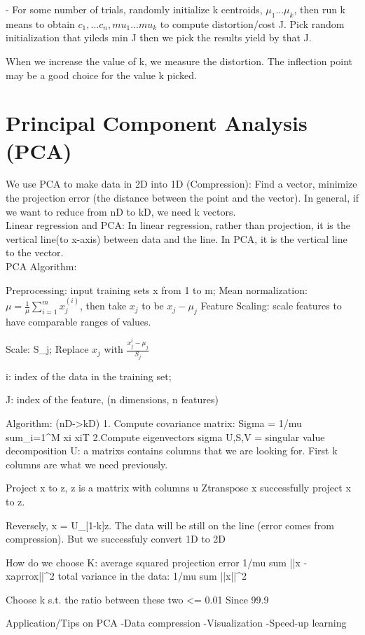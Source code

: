 \documentclass{article}
\begin{document}
- For some number of trials, randomly initialize k centroids, $\mu_1 ... \mu_k$, then run k means to obtain $c_1,...c_n, mu_1...mu_k$
to compute distortion/cost J. Pick random initialization that yileds min J
then we pick the results yield by that J.

When we increase the value of k, we measure the distortion. The inflection point may be a good choice for the value k picked.

\section*{Principal Component Analysis (PCA)}
We use PCA to make data in 2D into 1D (Compression): Find a vector, minimize the projection error (the distance between the point and the vector). In general, if we want to reduce from nD to kD, we need k vectors.\\


Linear regression and PCA: In linear regression, rather than projection, it is the vertical line(to x-axis) between data and the line. In PCA, it is the vertical line to the vector. \\

PCA Algorithm:

Preprocessing: input training sets x from 1 to m;
Mean normalization: $\mu = \frac{1}{\mu}\sum_{i=1}^m x_j^{(i)}$, then take $x_j$ to be $x_j - \mu_j$
Feature Scaling: scale features to have comparable ranges of values. 

Scale: S_j; Replace $x_j$ with $\frac{x_j^i - \mu_j}{S_j}$

i: index of the data in the training set; 

J: index of the feature, (n dimensions, n features)

Algorithm: (nD->kD)
1. Compute covariance matrix:
Sigma = 1/mu sum_i=1^M xi xiT
2.Compute eigenvectors sigma
U,S,V = singular value decomposition
U: a matrixs contains columns that we are looking for. First k columns are what we need previously.

Project x to z, z is a mattrix with columns u
Ztranspose x successfully project x to z. 

Reversely, x = U_[1-k]z. The data will be still on the line (error comes from compression). But we successfuly convert 1D to 2D

How do we choose K: average squared projection error 1/mu sum ||x - xaprrox||^2
total variance in the data: 1/mu sum ||x||^2

Choose k s.t. the ratio between these two  <= 0.01
Since 99.9%

Application/Tips on PCA
-Data compression
-Visualization
-Speed-up learning
\end{document}
